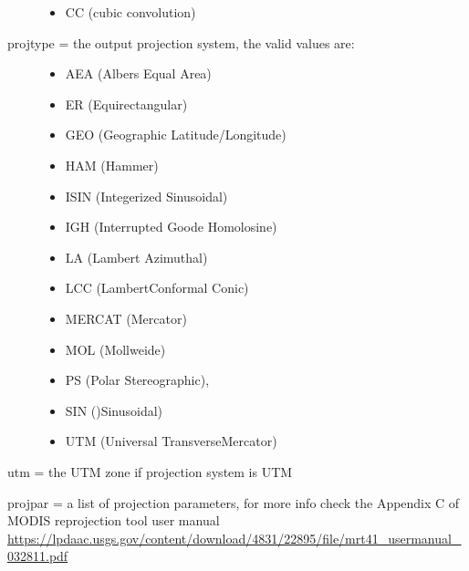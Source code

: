 \documentclass[a4paper,11pt,oneside]{sphinxmanual}
\begin{document}
\begin{fulllineitems}
\begin{fulllineitems}
\begin{description}
\begin{itemize}
\item {} 
CC (cubic convolution)

\end{itemize}

\item[{projtype = the output projection system, the valid values are:}] \leavevmode\begin{itemize}
\item {} 
AEA (Albers Equal Area)

\item {} 
ER (Equirectangular)

\item {} 
GEO (Geographic Latitude/Longitude)

\item {} 
HAM (Hammer)

\item {} 
ISIN (Integerized Sinusoidal)

\item {} 
IGH (Interrupted Goode Homolosine)

\item {} 
LA (Lambert Azimuthal)

\item {} 
LCC (LambertConformal Conic)

\item {} 
MERCAT (Mercator)

\item {} 
MOL (Mollweide)

\item {} 
PS (Polar Stereographic),

\item {} 
SIN ()Sinusoidal)

\item {} 
UTM (Universal TransverseMercator)

\end{itemize}

\end{description}

utm = the UTM zone if projection system is UTM

projpar = a list of projection parameters, for more info check
the Appendix C of MODIS reprojection tool user manual
\href{https://lpdaac.usgs.gov/content/download/4831/22895/file/mrt41\_usermanual\_032811.pdf}{https://lpdaac.usgs.gov/content/download/4831/22895/file/mrt41\_usermanual\_032811.pdf}

\end{fulllineitems}


\end{fulllineitems}
\end{document}
